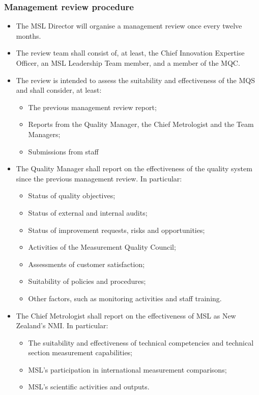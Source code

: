 \subsubsection{Management review procedure}
\begin{itemize}
\item The MSL Director will organise a management review once every twelve months. 
\item The review team shall consist of, at least, the Chief Innovation Expertise Officer, an MSL Leadership Team member, and a member of the MQC.
\item The review is intended to assess the suitability and effectiveness of the MQS and shall consider, at least:
\begin{itemize}
\item The previous management review report;
\item Reports from the Quality Manager, the Chief Metrologist and the Team Managers; 
\item Submissions from staff
\end{itemize}
\item The Quality Manager shall report on the effectiveness of the quality system since the previous management review. In particular:
\begin{itemize}
\item Status of quality objectives;
\item Status of external and internal audits;
\item Status of improvement requests, risks and opportunities;
\item Activities of the Measurement Quality Council;
\item Assessments of customer satisfaction;
\item Suitability of policies and procedures;
\item Other factors, such as monitoring activities and staff training.
\end{itemize}
\item The Chief Metrologist shall report on the effectiveness of MSL as New Zealand’s NMI. In particular:
\begin{itemize}
\item The suitability and effectiveness of technical competencies and technical section measurement capabilities;
\item MSL’s participation in international measurement comparisons;
\item MSL’s scientific activities and outputs.
\end{itemize}

\end{itemize}
